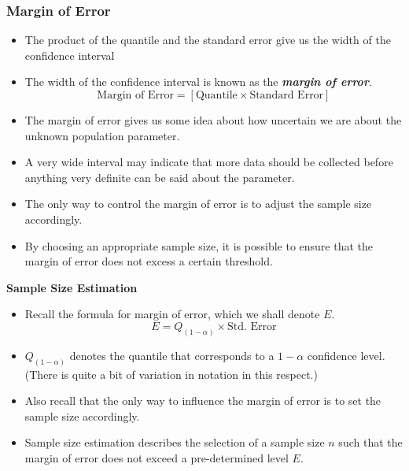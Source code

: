 \documentclass[]{report}
\begin{document}


\subsubsection{Margin of Error}

\begin{itemize}
\item The product of the quantile and the standard error give us the width of the confidence interval
\item The width of the confidence interval is known as the \textbf{\emph{margin of error}}.  \[ \mbox{Margin of Error}  = \left[ \mbox{Quantile} \times \mbox{Standard Error} \right] \]
\item The margin of error gives us some idea about how uncertain we are about the unknown population parameter. \item A very wide interval may indicate that more data should be collected before anything very definite can be said about the parameter.
\item The only way to control the margin of error is to adjust the sample size accordingly.
\item By choosing an appropriate sample size, it is possible to ensure that the margin of error does not excess a certain threshold.
\end{itemize}




\textbf{Sample Size Estimation}

\begin{itemize} \item  Recall the formula for margin of error, which we shall denote $E$.
\[  E = Q_{(1-\alpha)} \times \mbox{Std. Error}\]

\item  $Q_{(1-\alpha)}$ denotes the quantile that corresponds to a $1-\alpha$ confidence level. (There is quite a bit of variation in notation in this respect.)
\item  Also recall that the only way to influence the margin of error is to set the sample size accordingly.

\item  Sample size estimation describes the selection of a sample size $n$ such that the margin of error does not exceed a pre-determined level $E$.
\end{itemize}
\end{document}
